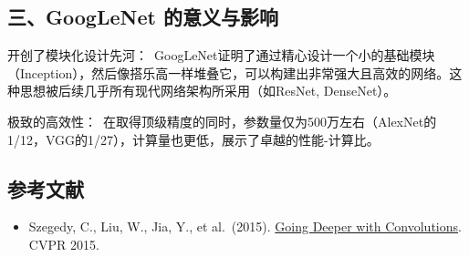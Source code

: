 \hypertarget{ux4e09googlenet-ux7684ux610fux4e49ux4e0eux5f71ux54cd}{%
\subsection{三、GoogLeNet 的意义与影响}\label{ux4e09googlenet-ux7684ux610fux4e49ux4e0eux5f71ux54cd}}

开创了模块化设计先河：~GoogLeNet证明了通过精心设计一个小的基础模块（Inception），然后像搭乐高一样堆叠它，可以构建出非常强大且高效的网络。这种思想被后续几乎所有现代网络架构所采用（如ResNet, DenseNet）。

极致的高效性：~在取得顶级精度的同时，参数量仅为500万左右（AlexNet的1/12，VGG的1/27），计算量也更低，展示了卓越的性能-计算比。

\FloatBarrier
{}
\hypertarget{ux53c2ux8003ux6587ux732e-13}{%
\subsection{参考文献}\label{ux53c2ux8003ux6587ux732e-13}}

\vspace{0.25em}
\begin{itemize}
\tightlist
\item
  Szegedy, C., Liu, W., Jia, Y., et al.~(2015). \href{https://arxiv.org/abs/1409.4842}{Going Deeper with Convolutions}. CVPR 2015.
\end{itemize}

\clearpage
